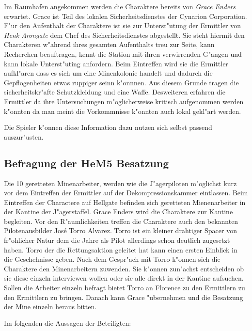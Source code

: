 Im Raumhafen angekommen werden die Charaktere bereits von \emph{Grace Enders} erwartet. Grace ist Teil  des lokalen Sicherheitsdienstes der Cynarion Corporation. F"ur den Aufenthalt der Charaktere ist sie zur Unterst"utung der Ermittler von \emph{Henk Arongate} dem Chef des Sicherheitsdienstes abgestellt. Sie steht hiermit den Charakteren w"ahrend ihres gesamten Aufenthalts treu zur Seite, kann Recherchen beauftragen, kennt die Station mit ihren verwirrenden G"angen und kann lokale Unterst"uting anfordern. Beim Eintreffen wird sie die Ermittler aufkl"aren dass es sich um eine Minenkolonie handelt und dadurch die Gepflogenheiten etwas ruppiger seinn k"onnnen. Aus diesem Grunde tragen die sicherheitskr"afte Schutzkleidung und eine Waffe. Desweiteren erfahren die Ermittler da\3 ihre Untersuchungen m"oglicherweise kritisch aufgenommen werden k"onnten da man meint die Vorkommnisse k"onnten auch lokal gekl"art werden.

\begin{remarks}
	Die Spieler k"onnen diese Information dazu nutzen sich selbst passend auszur"usten.
\end{remarks}

\subsection{Befragung der HeM5 Besatzung}

Die 10 geretteten Minenarbeiter, werden wie die J"agerpiloten m"oglichst kurz vor dem Eintreffen der Ermittler auf der Dekompressionskammer eintlassen. Beim Eintreffen der Charactere auf Hellgate befinden sich geretteten Mienenarbeiter in der Kantine der J"agerstaffel. Grace Enders wird die Charaktere zur Kantine begleiten. Vor den R"aumlichkeiten treffen die Charaktere auch den bekannten Pilotenausbilder Jos\'{e} \frqq{}Torro\flqq{} Alvarez. Torro ist ein kleiner drahtiger Spacer von fr"ohlicher Natur dem die Jahre als Pilot allerdings schon deutlich zugesetzt haben. Torro der die Rettungsaktion geleitet hat kann einen ersten Einblick in die Geschehnisse geben. Nach dem Gespr"ach mit Torro k"onnen sich die Charaktere den Minenarbeitern zuwenden. Sie k"onnen zun"achst entscheiden ob sie diese einzeln interviewen wollen oder sie alle direkt in der Kantine aufsuchen. Sollen die Arbeiter einzeln befragt bietet Torro an  Florence zu den Ermittlern zu den Ermittlern zu bringen. Danach kann Grace "ubernehmen und die Besatzung der Mine einzeln heraus bitten.

Im folgenden die Aussagen der Beteiligten:

